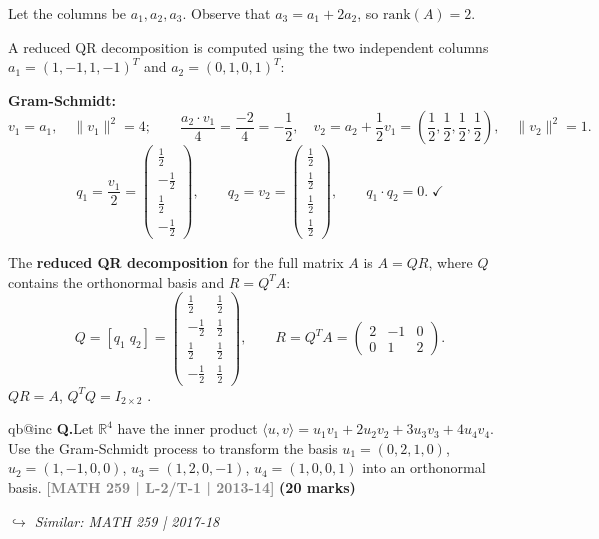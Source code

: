 \documentclass[12pt,a3paper]{article}
\makeatletter
\newcommand{\yr}[1]{\hfill\textcolor{gray}{\small\textbf{[#1]}}}
\newcommand{\mk}[1]{\textcolor{orange!70!black}{\small\textbf{(#1 marks)}}}
\newcommand{\variant}[1]{\par\vspace{1pt}\textcolor{blue!50!black}%
  {\footnotesize\textit{$\hookrightarrow$ Similar: #1}}}
\newcounter{qnum}
\newcommand{\Q}[1]{%
  \csname qb@inc\endcsname
  \needspace{4\baselineskip}
  \refstepcounter{qnum}
  \vspace{6pt}
  \noindent\textbf{Q\theqnum.}\enspace #1\par
}
\makeatother
\begin{document}
\begin{tcolorbox}[enhanced,breakable,colback=cD!4,colframe=cD,boxrule=0.8pt,arc=5pt,title={\textbf{Answer --- QR Decomposition of $A=\begin{pmatrix}1&0&1\\-1&1&1\\1&0&1\\-1&1&1\end{pmatrix}$}},fonttitle=\bfseries\color{white},colbacktitle=cD]
Let the columns be $a_1, a_2, a_3$. Observe that $a_3 = a_1 + 2a_2$, so $\mathrm{rank}(A)=2$.

A reduced QR decomposition is computed using the two independent columns $a_1=(1,-1,1,-1)^T$ and $a_2=(0,1,0,1)^T$:

\textbf{Gram-Schmidt:}
$$v_1=a_1,\quad \|v_1\|^2=4;\qquad
\frac{a_2\cdot v_1}{4}=\frac{-2}{4}=-\frac{1}{2},\quad
v_2=a_2+\frac{1}{2}v_1=\left(\frac{1}{2},\frac{1}{2},\frac{1}{2},\frac{1}{2}\right),\quad\|v_2\|^2=1.$$
$$q_1=\frac{v_1}{2}=\begin{pmatrix}\frac{1}{2}\\-\frac{1}{2}\\\frac{1}{2}\\-\frac{1}{2}\end{pmatrix},\qquad
q_2=v_2=\begin{pmatrix}\frac{1}{2}\\\frac{1}{2}\\\frac{1}{2}\\\frac{1}{2}\end{pmatrix},\qquad
q_1\cdot q_2=0.\;\checkmark$$

The \textbf{reduced QR decomposition} for the full matrix $A$ is $A=QR$, where $Q$ contains the orthonormal basis and $R=Q^TA$:
$$Q=[q_1\;q_2]=\begin{pmatrix}\frac{1}{2}&\frac{1}{2}\\-\frac{1}{2}&\frac{1}{2}\\\frac{1}{2}&\frac{1}{2}\\-\frac{1}{2}&\frac{1}{2}\end{pmatrix},\qquad
R=Q^TA=\begin{pmatrix}2&-1&0\\0&1&2\end{pmatrix}.$$
$QR=A$, $Q^TQ=I_{2\times 2}$ . \checkmark
\end{tcolorbox}

\Q{Let $\mathbb{R}^4$ have the inner product $\langle u,v \rangle = u_1v_1 + 2u_2v_2 + 3u_3v_3 + 4u_4v_4$. Use the Gram-Schmidt process to transform the basis $u_1 = (0,2,1,0)$, $u_2 = (1,-1,0,0)$, $u_3 = (1,2,0,-1)$, $u_4 = (1,0,0,1)$ into an orthonormal basis.
\yr{MATH 259 | L-2/T-1 | 2013-14} \mk{20}
\variant{MATH 259 | 2017-18}}
\end{document}
